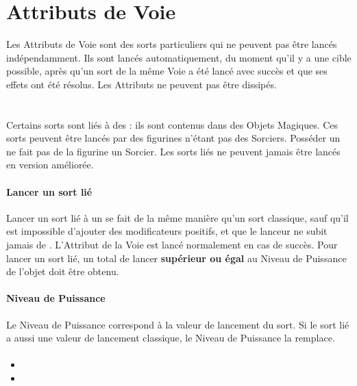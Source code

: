 \section{Attributs de Voie}

Les Attributs de Voie sont des sorts particuliers qui ne peuvent pas être lancés indépendamment. Ils sont lancés automatiquement, du moment qu'il y a une cible possible, après qu'un sort de la même Voie a été lancé avec succès et que ses effets ont été résolus. Les Attributs ne peuvent pas être dissipés.

\newpage
\section{\boundspell{}}

Certains sorts sont liés à des \boundspells{} : ils sont contenus dans des Objets Magiques. Ces sorts peuvent être lancés par des figurines n'étant pas des Sorciers. Posséder un \boundspell{} ne fait pas de la figurine un Sorcier. Les sorts liés ne peuvent jamais être lancés en version améliorée.

\paragraph{Lancer un sort lié}

Lancer un sort lié à un \boundspell{} se fait de la même manière qu'un sort classique, sauf qu'il est impossible d'ajouter des modificateurs positifs, et que le lanceur ne subit jamais de \lostfocus{}. L'Attribut de la Voie est lancé normalement en cas de succès. Pour lancer un sort lié, un total de lancer \textbf{supérieur ou égal} au Niveau de Puissance de l'objet doit être obtenu.

\paragraph{Niveau de Puissance}

Le Niveau de Puissance correspond à la valeur de lancement du sort. Si le sort lié a aussi une valeur de lancement classique, le Niveau de Puissance la remplace.

\paragraph{\overwhelmingpower}

\begin{itemize}[label={-}]
\item {}
\item {}
\end{itemize}

